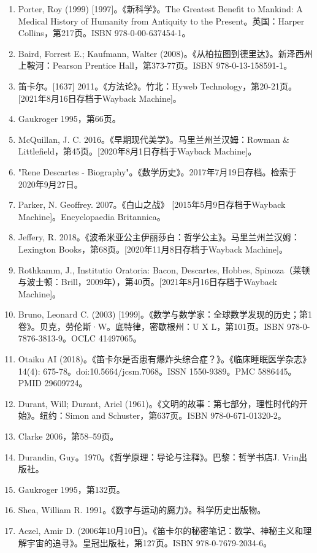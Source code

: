 \begin{enumerate}
\item Porter, Roy (1999) [1997]。《新科学》。The Greatest Benefit to Mankind: A Medical History of Humanity from Antiquity to the Present。英国：Harper Collins，第217页。ISBN 978-0-00-637454-1。
\item Baird, Forrest E.; Kaufmann, Walter (2008)。《从柏拉图到德里达》。新泽西州上鞍河：Pearson Prentice Hall，第373-77页。ISBN 978-0-13-158591-1。
\item 笛卡尔。[1637] 2011。《方法论》。竹北：Hyweb Technology，第20-21页。[2021年8月16日存档于Wayback Machine]。
\item Gaukroger 1995，第66页。
\item McQuillan, J. C. 2016。《早期现代美学》。马里兰州兰汉姆：Rowman & Littlefield，第45页。[2020年8月1日存档于Wayback Machine]。
\item "Rene Descartes - Biography"。《数学历史》。2017年7月19日存档。检索于2020年9月27日。
\item Parker, N. Geoffrey. 2007。《白山之战》 [2015年5月9日存档于Wayback Machine]。Encyclopaedia Britannica。
\item Jeffery, R. 2018。《波希米亚公主伊丽莎白：哲学公主》。马里兰州兰汉姆：Lexington Books，第68页。[2020年11月8日存档于Wayback Machine]。
\item Rothkamm, J., Institutio Oratoria: Bacon, Descartes, Hobbes, Spinoza（莱顿与波士顿：Brill，2009年），第40页。[2021年8月16日存档于Wayback Machine]。
\item Bruno, Leonard C. (2003) [1999]。《数学与数学家：全球数学发现的历史；第1卷》。贝克，劳伦斯·W。底特律，密歇根州：U X L，第101页。ISBN 978-0-7876-3813-9。OCLC 41497065。
\item Otaiku AI (2018)。《笛卡尔是否患有爆炸头综合症？》。《临床睡眠医学杂志》14(4): 675-78。doi:10.5664/jcsm.7068。ISSN 1550-9389。PMC 5886445。PMID 29609724。
\item Durant, Will; Durant, Ariel (1961)。《文明的故事：第七部分，理性时代的开始》。纽约：Simon and Schuster，第637页。ISBN 978-0-671-01320-2。
\item Clarke 2006，第58–59页。
\item Durandin, Guy。1970。《哲学原理：导论与注释》。巴黎：哲学书店J. Vrin出版社。
\item Gaukroger 1995，第132页。
\item Shea, William R. 1991。《数字与运动的魔力》。科学历史出版物。
\item Aczel, Amir D. (2006年10月10日)。《笛卡尔的秘密笔记：数学、神秘主义和理解宇宙的追寻》。皇冠出版社，第127页。ISBN 978-0-7679-2034-6。

\end{enumerate}
